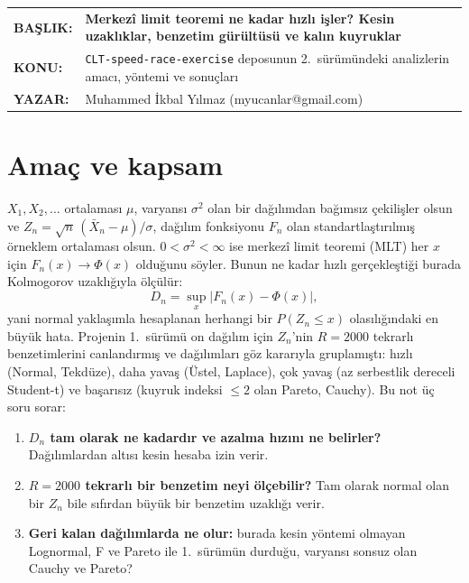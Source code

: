 \documentclass[11pt,a4paper]{article}
\begin{document}
\vspace*{14pt}
\begin{tabular}{@{}p{2.35cm}@{}p{\dimexpr\textwidth-2.35cm}@{}}
\textbf{BAŞLIK:} & \textbf{\large Merkezî limit teoremi ne kadar hızlı işler? Kesin uzaklıklar, benzetim gürültüsü ve kalın kuyruklar}\\[3pt]
\textbf{KONU:} & \texttt{CLT-speed-race-exercise} deposunun 2.\ sürümündeki analizlerin amacı, yöntemi ve sonuçları\\[3pt]
\textbf{YAZAR:} & Muhammed İkbal Yılmaz (myucanlar@gmail.com)
\end{tabular}

\vspace{8pt}
\vspace{12pt}

\section{Amaç ve kapsam}

$X_1, X_2, \dots$ ortalaması $\mu$, varyansı $\sigma^2$ olan bir dağılımdan bağımsız çekilişler olsun ve
$Z_n = \sqrt n\,(\bar X_n - \mu)/\sigma$, dağılım fonksiyonu $F_n$ olan standartlaştırılmış örneklem ortalaması olsun.
$0 < \sigma^2 < \infty$ ise merkezî limit teoremi (MLT) her $x$ için $F_n(x) \to \Phi(x)$ olduğunu söyler. Bunun ne kadar hızlı
gerçekleştiği burada Kolmogorov uzaklığıyla ölçülür:
\[
D_n = \sup_x \lvert F_n(x) - \Phi(x)\rvert ,
\]
yani normal yaklaşımla hesaplanan herhangi bir $P(Z_n \le x)$ olasılığındaki en büyük hata. Projenin 1.\ sürümü on dağılım için
$Z_n$'nin $R = 2000$ tekrarlı benzetimlerini canlandırmış ve dağılımları göz kararıyla gruplamıştı: hızlı (Normal, Tekdüze), daha
yavaş (Üstel, Laplace), çok yavaş (az serbestlik dereceli Student-t) ve başarısız (kuyruk indeksi $\le 2$ olan Pareto, Cauchy). Bu
not üç soru sorar:

\begin{enumerate}
  \item \textbf{$D_n$ tam olarak ne kadardır ve azalma hızını ne belirler?} Dağılımlardan altısı kesin hesaba izin verir.
  \item \textbf{$R = 2000$ tekrarlı bir benzetim neyi ölçebilir?} Tam olarak normal olan bir $Z_n$ bile sıfırdan büyük bir benzetim
  uzaklığı verir.
  \item \textbf{Geri kalan dağılımlarda ne olur:} burada kesin yöntemi olmayan Lognormal, F ve Pareto ile 1.\ sürümün durduğu,
  varyansı sonsuz olan Cauchy ve Pareto?
\end{enumerate}
\end{document}
